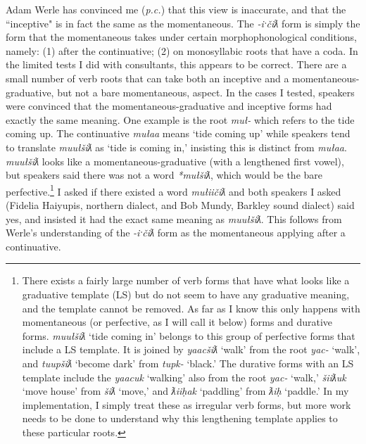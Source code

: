 Adam Werle has convinced me (\textit{p.c.}) that this view is inaccurate, and that the ``inceptive" is in fact the same as the momentaneous. The \textit{-iˑčiƛ} form is simply the form that the momentaneous takes under certain morphophonological conditions, namely: (1) after the continuative; (2) on monosyllabic roots that have a coda. In the limited tests I did with consultants, this appears to be correct. There are a small number of verb roots that can take both an inceptive and a momentaneous-graduative, but not a bare momentaneous, aspect. In the cases I tested, speakers were convinced that the momentaneous-graduative and inceptive forms had exactly the same meaning. One example is the root \textit{muł-} which refers to the tide coming up. The continuative \textit{mułaa} means `tide coming up' while speakers tend to translate \textit{muułšiƛ} as `tide is coming in,' insisting this is distinct from \textit{mułaa}. \textit{muułšiƛ} looks like a momentaneous-graduative (with a lengthened first vowel), but speakers said there was not a word \textit{*mułšiƛ}, which would be the bare perfective.\footnote{There exists a fairly large number of verb forms that have what looks like a graduative template (LS) but do not seem to have any graduative meaning, and the template cannot be removed. As far as I know this only happens with momentaneous (or perfective, as I will call it below) forms and durative forms. \textit{muułšiƛ} `tide coming in' belongs to this group of perfective forms that include a LS template. It is joined by \textit{yaacšiƛ} `walk' from the root \textit{yac-} `walk', and \textit{tuupšiƛ} `become dark' from \textit{tupk-} `black.' The durative forms with an LS template include the \textit{yaacuk} `walking' also from the root \textit{yac-} `walk,' \textit{šiiƛuk} `move house' from \textit{šiƛ} `move,' and \textit{ƛiiḥak} `paddling' from \textit{ƛiḥ} `paddle.' In my implementation, I simply treat these as irregular verb forms, but more work needs to be done to understand why this lengthening template applies to these particular roots.} I asked if there existed a word \textit{mułiičiƛ} and both speakers I asked (Fidelia Haiyupis, northern dialect, and Bob Mundy, Barkley sound dialect) said yes, and insisted it had the exact same meaning as \textit{muułšiƛ}. This follows from Werle's understanding of the \textit{-iˑčiƛ} form as the momentaneous applying after a continuative.

